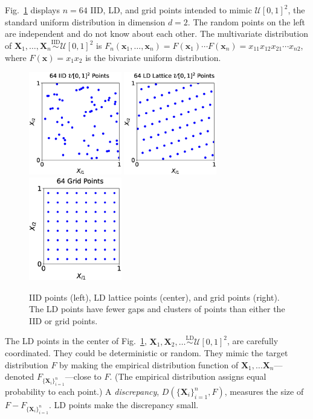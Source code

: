 \documentclass[11pt]{NSFamsart}
\newcommand{\bx}{{\boldsymbol{x}}}
\newcommand{\bX}{{\boldsymbol{X}}}
\newcommand{\calu}{{\mathcal{U}}}
\newcommand{\IIDSim}{\overset{\text{IID}}{\sim}}
\newcommand{\LDSim}{\overset{\text{LD}}{\sim}}
\begin{document}
Fig.\ \ref{fig:iid_vs_ld} displays $n=64$ IID, LD, and grid points intended to mimic $\calu[0,1]^2$, the standard uniform distribution in dimension $d=2$.  The random points on the left are independent and do not know about each other.  The multivariate distribution of $\bX_1, \ldots, \bX_n \IIDSim \calu[0,1]^2 $ is $F_{n}(\bx_1, \ldots, \bx_n) = F(\bx_1)
\cdots F(\bx_n) = x_{11}x_{12} x_{21} \cdots x_{n2}$, where $F(\bx)  = x_1x_2$ is the bivariate uniform distribution.

\begin{figure}[H]
	\centering
	\includegraphics[height = 4.5cm]{ProgramsImages/iid_scatter.eps} \quad
	\includegraphics[height = 4.5cm]{ProgramsImages/lattice_scatter.eps} \quad
	\includegraphics[height = 4.5cm]{ProgramsImages/grid_scatter.eps}
	\caption{IID points (left), LD lattice points (center), and grid points (right).  The LD points have fewer gaps and clusters of points than either the IID or grid points. \label{fig:iid_vs_ld}}
\end{figure}

The  LD points in the center of Fig.\ \ref{fig:iid_vs_ld}, $\bX_1, \bX_2,  \ldots \LDSim \calu[0,1]^2$, are carefully coordinated.  They could be deterministic or random.  They mimic the target distribution $F$  by making the empirical distribution function of  $\bX_1, \ldots \bX_n$---denoted $F_{\{\bX_i\}_{i=1}^n}$---close to $F$.  (The empirical distribution assigns equal probability to each point.)  A \emph{discrepancy}, $D(\{\bX_i\}_{i=1}^n, F)$, measures the size of $F - F_{\{\bX_i\}_{i=1}^n}$.  LD points make the discrepancy small.
\end{document}
